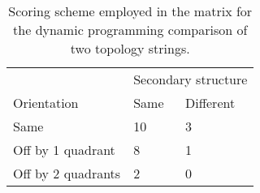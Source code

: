 \documentclass{article}
\begin{document}

\begin{table}
\caption{\label{tab:matrix} Scoring scheme employed in the matrix for
the dynamic programming comparison of two topology strings.}
\begin{center}
\begin{tabularx}{\linewidth}{Xll}\hline
                        & \multicolumn{2}{c}{Secondary structure} \\ \cline{2-3}
Orientation             & Same  & Different     \\ \hline
Same                    & 10    & 3             \\
Off by 1 quadrant       & 8     & 1             \\
Off by 2 quadrants      & 2     & 0             \\ \hline
\end{tabularx}
\end{center}
\end{table}
\end{document}

